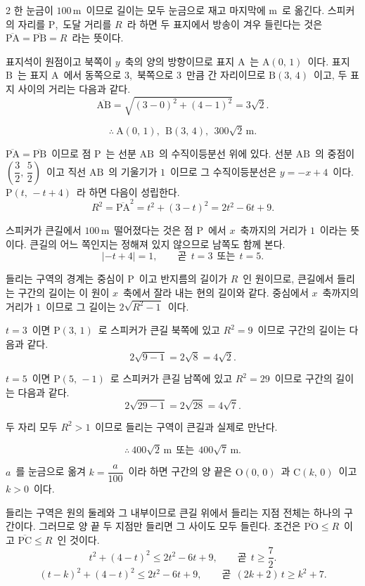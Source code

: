 \documentclass[10pt,fleqn]{article}
\begin{document}
\begin{multicols*}{2}
한 눈금이 $100\,\mathrm{m}$\ 이므로 길이는 모두 눈금으로 재고 마지막에 $\mathrm{m}$\ 로 옮긴다. 스피커의 자리를 $\mathrm{P}$,\ 도달 거리를 $R$\ 라 하면 두 표지에서 방송이 겨우 들린다는 것은 $\overline{\mathrm{PA}}=\overline{\mathrm{PB}}=R$\ 라는 뜻이다.

 표지석이 원점이고 북쪽이 $y$\ 축의 양의 방향이므로 표지 $\mathrm{A}$\ 는 $\mathrm{A}(0,\,1)$\ 이다. 표지 $\mathrm{B}$\ 는 표지 $\mathrm{A}$\ 에서 동쪽으로 $3$,\ 북쪽으로 $3$\ 만큼 간 자리이므로 $\mathrm{B}(3,\,4)$\ 이고, 두 표지 사이의 거리는 다음과 같다.
$$\overline{\mathrm{AB}}=\sqrt{(3-0)^{2}+(4-1)^{2}}=3\sqrt2.$$

$$\therefore\ \mathrm{A}(0,\,1),\ \ \mathrm{B}(3,\,4),\ \ 300\sqrt2\,\mathrm{m}.$$

 $\overline{\mathrm{PA}}=\overline{\mathrm{PB}}$\ 이므로 점 $\mathrm{P}$\ 는 선분 $\mathrm{AB}$\ 의 수직이등분선 위에 있다. 선분 $\mathrm{AB}$\ 의 중점이 $\left(\dfrac32,\,\dfrac52\right)$\ 이고 직선 $\mathrm{AB}$\ 의 기울기가 $1$\ 이므로 그 수직이등분선은 $y=-x+4$\ 이다. $\mathrm{P}(t,\,-t+4)$\ 라 하면 다음이 성립한다.
$$R^{2}=\overline{\mathrm{PA}}^{2}=t^{2}+(3-t)^{2}=2t^{2}-6t+9.$$

스피커가 큰길에서 $100\,\mathrm{m}$\ 떨어졌다는 것은 점 $\mathrm{P}$\ 에서 $x$\ 축까지의 거리가 $1$\ 이라는 뜻이다. 큰길의 어느 쪽인지는 정해져 있지 않으므로 남쪽도 함께 본다.
$$|-t+4|=1,\qquad \text{곧}\ \ t=3\ \ \text{또는}\ \ t=5.$$

들리는 구역의 경계는 중심이 $\mathrm{P}$\ 이고 반지름의 길이가 $R$\ 인 원이므로, 큰길에서 들리는 구간의 길이는 이 원이 $x$\ 축에서 잘라 내는 현의 길이와 같다. 중심에서 $x$\ 축까지의 거리가 $1$\ 이므로 그 길이는 $2\sqrt{R^{2}-1}$\ 이다.

$t=3$\ 이면 $\mathrm{P}(3,\,1)$\ 로 스피커가 큰길 북쪽에 있고 $R^{2}=9$\ 이므로 구간의 길이는 다음과 같다.
$$2\sqrt{9-1}=2\sqrt8=4\sqrt2.$$

$t=5$\ 이면 $\mathrm{P}(5,\,-1)$\ 로 스피커가 큰길 남쪽에 있고 $R^{2}=29$\ 이므로 구간의 길이는 다음과 같다.
$$2\sqrt{29-1}=2\sqrt{28}=4\sqrt7.$$

두 자리 모두 $R^{2}>1$\ 이므로 들리는 구역이 큰길과 실제로 만난다.

$$\therefore\ 400\sqrt2\,\mathrm{m}\ \ \text{또는}\ \ 400\sqrt7\,\mathrm{m}.$$

 $a$\ 를 눈금으로 옮겨 $k=\dfrac{a}{100}$\ 이라 하면 구간의 양 끝은 $\mathrm{O}(0,\,0)$\ 과 $\mathrm{C}(k,\,0)$\ 이고 $k>0$\ 이다.

들리는 구역은 원의 둘레와 그 내부이므로 큰길 위에서 들리는 지점 전체는 하나의 구간이다. 그러므로 양 끝 두 지점만 들리면 그 사이도 모두 들린다. 조건은 $\overline{\mathrm{PO}}\le R$\ 이고 $\overline{\mathrm{PC}}\le R$\ 인 것이다.
$$t^{2}+(4-t)^{2}\le 2t^{2}-6t+9,\qquad \text{곧}\ \ t\ge\dfrac72.$$
$$(t-k)^{2}+(4-t)^{2}\le 2t^{2}-6t+9,\qquad \text{곧}\ \ (2k+2)\,t\ge k^{2}+7.$$


\end{multicols*}
\end{document}
